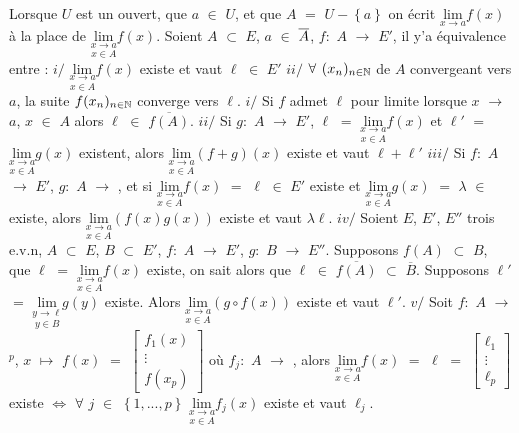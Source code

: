 \documentclass{article}
\begin{document}
\notation Lorsque $U$ est un ouvert, que $a$ $\in$ $U$, et que $A$ $=$ $U-\left\{ a \right\}$ on écrit $\underset{x \rightarrow a}{\text{lim}}f(x)$ à la place de $\underset{x \in A}{\underset{x \rightarrow a}{\text{lim}}}f(x)$.
\s
\newcommand{\ace}{$A$ $\subset$ $E$}
\proposition Soient \ace, $a$ $\in$ $\overline{A}$, $f:$ $A$ $\longrightarrow$ $E'$, il y'a équivalence entre : \s
$i/$ $\underset{x \in A}{\underset{x \rightarrow a}{\text{lim}}}f(x)$ existe et vaut $\ell$ $\in$ $E'$ \s
$ii/$ $\forall$ $(x_n)_{n \in \mathbb{N}}$ de $A$ convergeant vers $a$, la suite $f(x_n)_{n \in \mathbb{N}}$ converge vers $\ell$.
\proprietes
$i/$ Si $f$ admet $\ell$ pour limite lorsque $x$ $\longrightarrow$ $a$, $x$ $\in$ $A$ alors $\ell$ $\in$ $\overline{f(A)}$. \s
$ii/$ Si $g:$ $A$ $\longrightarrow$ $E'$, $\ell$ $=$  $\underset{x \in A}{\underset{x \rightarrow a}{\text{lim}}}f(x)$ et $\ell'$ $=$  $\underset{x \in A}{\underset{x \rightarrow a}{\text{lim}}}g(x)$ existent, alors $\underset{x \in A}{\underset{x \rightarrow a}{\text{lim}}}(f + g)(x)$ existe et vaut $\ell + \ell'$ \s
$iii/$ Si $f:$ $A$ $\longrightarrow$ $E'$, $g:$ $A$ $\longrightarrow$ \R, et si  $\underset{x \in A}{\underset{x \rightarrow a}{\text{lim}}}f(x)$ $=$ $\ell$ $\in$ $E'$ existe et $\underset{x \in A}{\underset{x \rightarrow a}{\text{lim}}}g(x)$ $=$ $\lambda$ $\in$ \R $\text{ }$existe, alors \s $\underset{x \in A}{\underset{x \rightarrow a}{\text{lim}}}(f(x)g(x))$ existe et vaut $\lambda \ell$.  \s
$iv/$ Soient $E$, $E'$, $E''$ trois e.v.n, \ace, $B$ $\subset$ $E'$, $f:$ $A$ $\longrightarrow$ $E'$, $g:$ $B$ $\longrightarrow$ $E''$. Supposons $f(A)$ $\subset$ $B$, que $\ell$ $=$  \s $\underset{x \in A}{\underset{x \rightarrow a}{\text{lim}}}f(x)$ existe, on sait alors que $\ell$ $\in$ $\overline{f(A)}$ $\subset$ $\overline{B}$. Supposons $\ell'$ $=$  $\underset{y \in B}{\underset{y \rightarrow \ell}{\text{lim}}}g(y)$ existe. Alors $\underset{x \in A}{\underset{x \rightarrow a}{\text{lim}}}(g \circ f(x))$ existe \s  et vaut $\ell'$.\s
$v/$ Soit $f:$ $A$ $\longrightarrow$ \R$^p$, $x$ $\mapsto$ $f(x)$ $=$ $\begin{bmatrix}
	f_1(x) \\
	\vdots \\
	f(x_p)
\end{bmatrix}$ où $f_j:$ $A$ $\longrightarrow$ \R, alors $\underset{x \in A}{\underset{x \rightarrow a}{\text{lim}}}f(x)$ $=$ $\ell$ $=$ $\begin{bmatrix}
	\ell_1 \\
	\vdots \\
	\ell_p
\end{bmatrix}$ existe $\Longleftrightarrow$ \s $\forall$ $j$ $\in$ $\left\{ 1, ..., p \right\}$ $\underset{x \in A}{\underset{x \rightarrow a}{\text{lim}}}f_j(x)$ existe et vaut $\ell_j$. \s
\end{document}
